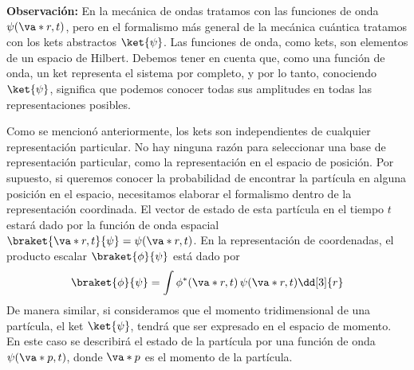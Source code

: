 \textbf{Observación:} En la mecánica de ondas tratamos con las funciones de onda $\psi(\va*{r}, t)$, pero en el formalismo más general de la mecánica cuántica tratamos con los kets abstractos $\ket{\psi}$. Las funciones de onda, como kets, son elementos de un espacio de Hilbert. Debemos tener en cuenta que, como una función de onda, un ket representa el sistema por completo, y por lo tanto, conociendo $\ket{\psi}$, significa que podemos conocer todas sus amplitudes en todas las representaciones posibles.
\par
Como se mencionó anteriormente, los kets son independientes de cualquier representación particular. No hay ninguna razón para seleccionar una base de representación particular, como la representación en el espacio de posición. Por supuesto, si queremos conocer la probabilidad de encontrar la partícula en alguna posición en el espacio, necesitamos elaborar el formalismo dentro de la representación coordinada. El vector de estado de esta partícula en el tiempo $t$ estará dado por la función de onda espacial $\braket{\va*{r}, t}{\psi} = \psi(\va*{r}, t)$. En la representación de coordenadas, el producto escalar $\braket{\phi}{\psi}$ está dado por
\begin{equation}
\braket{\phi}{\psi} = \int \phi^{*}(\va*{r}, t) \, \psi(\va*{r}, t) \dd[3]{r}
\label{eq:ecuacion_02_25}
\end{equation}
De manera similar, si consideramos que el momento tridimensional de una partícula, el ket $\ket{\psi}$, tendrá que ser expresado en el espacio de momento. En este caso se describirá el estado de la partícula por una función de onda $\psi( \va*{p}, t)$, donde $\va*{p}$ es el momento de la partícula.
